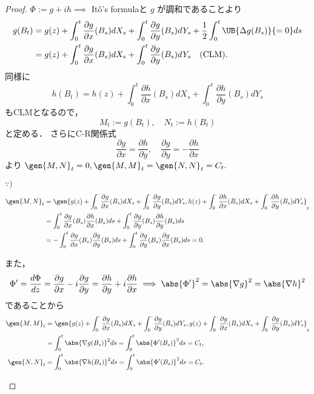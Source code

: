 \documentclass{jsarticle}
\begin{document}
\begin{proof}
    $\Phi:=g+ih\implies $ It\^{o}'s formulaと $g$ が調和であることより
    \begin{align}
        g(B_t)
        &= g(z)
        + \int_0^t\frac{\partial g}{\partial x}(B_s)dX_s
        + \int_0^t\frac{\partial g}{\partial y}(B_s)dY_s
        + \frac{1}{2}\int_0^t\UB{\Delta g(B_s)}{=0}ds \\
        &= g(z)
        + \int_0^t\frac{\partial g}{\partial x}(B_s)dX_s
        + \int_0^t\frac{\partial g}{\partial y}(B_s)dY_s
        \quad\text{(CLM)}.
    \end{align}
    同様に
    $$
    h(B_t)
    =h(z)
    + \int_0^t\frac{\partial h}{\partial x}(B_s)dX_s
    + \int_0^t\frac{\partial h}{\partial y}(B_s)dY_s
    $$
    もCLMとなるので，
    $$
    M_t:= g(B_t), \quad
    N_t:= h(B_t)
    $$
    と定める．
    さらにC-R関係式
    $$
    \frac{\partial g}{\partial x} = \frac{\partial h}{\partial y},\quad
    \frac{\partial g}{\partial y} = -\frac{\partial h}{\partial x}
    $$
    より $\gen{M, N}_t=0, \gen{M, M}_t=\gen{N, N}_t=C_t.$

    \begin{screen}
        $\because)$
        \begin{align}
            \gen{M, N}_t
            &= \gen{g(z)+\int_0^{\cdot}\frac{\partial g}{\partial x}(B_s)dX_s+\int_0^{\cdot}\frac{\partial g}{\partial y}(B_s)dY_s,
            h(z)+\int_0^{\cdot}\frac{\partial h}{\partial x}(B_s)dX_s+\int_0^{\cdot}\frac{\partial h}{\partial y}(B_s)dY_s}_t \\
            &= \int_0^t\frac{\partial g}{\partial x}(B_s)\frac{\partial h}{\partial x}(B_s)ds
            + \int_0^t\frac{\partial g}{\partial y}(B_s)\frac{\partial h}{\partial y}(B_s)ds \\
            &= -\int_0^t\frac{\partial g}{\partial x}(B_s)\frac{\partial g}{\partial y}(B_s)ds
            + \int_0^t\frac{\partial g}{\partial y}(B_s)\frac{\partial g}{\partial x}(B_s)ds = 0.
        \end{align}

        また，
        $$
        \Phi'
        = \frac{d\Phi}{dz}
        = \frac{\partial g}{\partial x} - i\frac{\partial g}{\partial y}
        = \frac{\partial h}{\partial y} + i\frac{\partial h}{\partial x}
        \implies \abs{\Phi'}^2
        = \abs{\nabla g}^2
        = \abs{\nabla h}^2
        $$
        であることから
        \begin{align}
            \gen{M, M}_t
            &= \gen{g(z)+\int_0^{\cdot}\frac{\partial g}{\partial x}(B_s)dX_s+\int_0^{\cdot}\frac{\partial g}{\partial y}(B_s)dY_s,
            g(z)+\int_0^{\cdot}\frac{\partial g}{\partial x}(B_s)dX_s+\int_0^{\cdot}\frac{\partial g}{\partial y}(B_s)dY_s}_t \\
            &= \int_0^t\abs{\nabla g(B_s)}^2ds
            = \int_0^t\abs{\Phi'(B_s)}^2ds
            = C_t, \\
            \gen{N, N}_t
            &= \int_0^t\abs{\nabla h(B_s)}^2ds
            = \int_0^t\abs{\Phi'(B_s)}^2ds
            = C_t.
        \end{align}
    \end{screen}


\end{proof}
\end{document}
